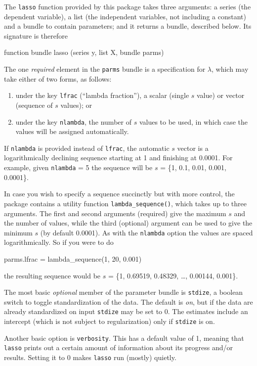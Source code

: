 \documentclass{article}
\begin{document}
The \texttt{lasso} function provided by this package takes three
arguments: a series (the dependent variable), a list (the independent
variables, not including a constant) and a bundle to contain
parameters; and it returns a bundle, described below. Its signature is
therefore
\begin{code}
function bundle lasso (series y, list X, bundle parms)
\end{code}

The one \textit{required} element in the \texttt{parms} bundle is a
specification for $\lambda$, which may take either of two forms, as
follows:
\begin{enumerate}
\item under the key \texttt{lfrac} (``lambda fraction''), a scalar
  (single $s$ value) or vector (sequence of $s$ values); or
\item under the key \texttt{nlambda}, the number of $s$ values to be
  used, in which case the values will be assigned automatically.
\end{enumerate}
If \texttt{nlambda} is provided instead of \texttt{lfrac}, the
automatic $s$ vector is a logarithmically declining sequence starting
at 1 and finishing at 0.0001. For example, given \texttt{nlambda} = 5
the sequence will be $s$ = \{1, 0.1, 0.01, 0.001, 0.0001\}.

In case you wish to specify a sequence succinctly but with more
control, the package contains a utility function
\texttt{lambda\_sequence()}, which takes up to three arguments. The
first and second arguments (required) give the maximum $s$ and the
number of values, while the third (optional) argument can be used to
give the minimum $s$ (by default 0.0001). As with the \texttt{nlambda}
option the values are spaced logarithmically.  So if you were to do
\begin{code}
parms.lfrac = lambda_sequence(1, 20, 0.001)
\end{code}
the resulting sequence would be $s$ = \{1, 0.69519, 0.48329, \dots,
0.00144, 0.001\}.

The most basic \textit{optional} member of the parameter bundle is
\texttt{stdize}, a boolean switch to toggle standardization of the
data. The default is \textit{on}, but if the data are already
standardized on input \texttt{stdize} may be set to 0.  The estimates
include an intercept (which is not subject to regularization) only if
\texttt{stdize} is on.

Another basic option is \texttt{verbosity}. This has a default value
of 1, meaning that \texttt{lasso} prints out a certain amount of
information about its progress and/or results. Setting it to 0 makes
\texttt{lasso} run (mostly) quietly.
\end{document}
